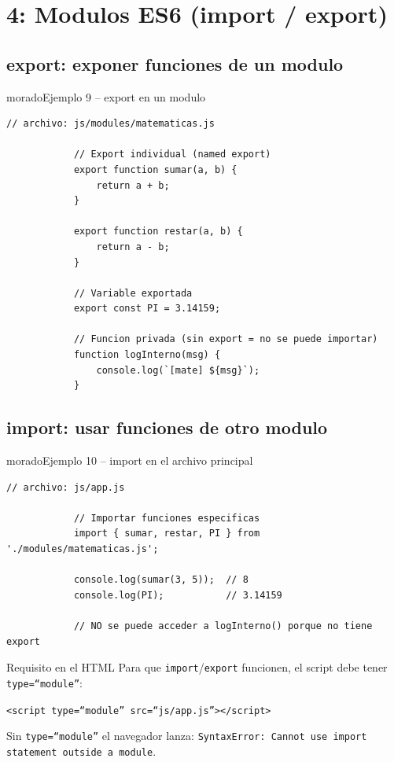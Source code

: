 \documentclass[11pt,a4paper]{article}
\begin{document}
	\section{4: Modulos ES6 (import / export)}
	
	\subsection{export: exponer funciones de un modulo}
	
	\begin{cajacodigo}{morado}{Ejemplo 9 -- export en un modulo}
		\begin{lstlisting}[style=codejs]
			// archivo: js/modules/matematicas.js
			
			// Export individual (named export)
			export function sumar(a, b) {
				return a + b;
			}
			
			export function restar(a, b) {
				return a - b;
			}
			
			// Variable exportada
			export const PI = 3.14159;
			
			// Funcion privada (sin export = no se puede importar)
			function logInterno(msg) {
				console.log(`[mate] ${msg}`);
			}
		\end{lstlisting}
	\end{cajacodigo}
	
	\subsection{import: usar funciones de otro modulo}
	
	\begin{cajacodigo}{morado}{Ejemplo 10 -- import en el archivo principal}
		\begin{lstlisting}[style=codejs]
			// archivo: js/app.js
			
			// Importar funciones especificas
			import { sumar, restar, PI } from './modules/matematicas.js';
			
			console.log(sumar(3, 5));  // 8
			console.log(PI);           // 3.14159
			
			// NO se puede acceder a logInterno() porque no tiene export
		\end{lstlisting}
	\end{cajacodigo}
	
	\begin{cajaconcepto}{Requisito en el HTML}
		Para que \texttt{import}/\texttt{export} funcionen, el script debe tener \texttt{type=``module''}:
		
		\texttt{<script type=``module'' src=``js/app.js''></script>}
		
		Sin \texttt{type=``module''} el navegador lanza: \texttt{SyntaxError: Cannot use import statement outside a module}.
	\end{cajaconcepto}
	
\end{document}
